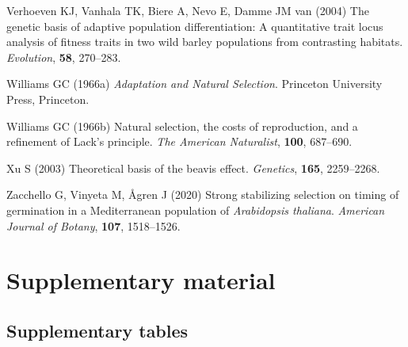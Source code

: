 \documentclass[
]{article}
\begin{document}
\leavevmode\hypertarget{ref-Verhoeven2004}{}%
Verhoeven KJ, Vanhala TK, Biere A, Nevo E, Damme JM van (2004) The genetic basis of adaptive population differentiation: A quantitative trait locus analysis of fitness traits in two wild barley populations from contrasting habitats. \emph{Evolution}, \textbf{58}, 270--283.

\leavevmode\hypertarget{ref-Williams1966}{}%
Williams GC (1966a) \emph{Adaptation and Natural Selection}. Princeton University Press, Princeton.

\leavevmode\hypertarget{ref-Williams1966a}{}%
Williams GC (1966b) Natural selection, the costs of reproduction, and a refinement of Lack's principle. \emph{The American Naturalist}, \textbf{100}, 687--690.

\leavevmode\hypertarget{ref-xu2003theoretical}{}%
Xu S (2003) Theoretical basis of the beavis effect. \emph{Genetics}, \textbf{165}, 2259--2268.

\leavevmode\hypertarget{ref-zacchello2020strong}{}%
Zacchello G, Vinyeta M, Ågren J (2020) Strong stabilizing selection on timing of germination in a Mediterranean population of \emph{Arabidopsis thaliana}. \emph{American Journal of Botany}, \textbf{107}, 1518--1526.

\newpage

\hypertarget{supplementary-material}{%
\section*{Supplementary material}\label{supplementary-material}}

\setcounter{table}{0}  \renewcommand{\thetable}{S\arabic{table}} \setcounter{figure}{0} \renewcommand{\thefigure}{S\arabic{figure}}

\hypertarget{supplementary-tables}{%
\subsection{Supplementary tables}\label{supplementary-tables}}
\end{document}
